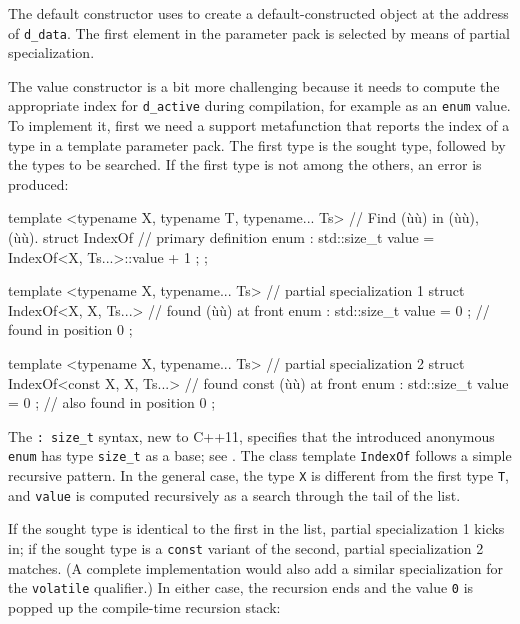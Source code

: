 \noindent The default constructor uses  to create a
default-constructed object at the address of \lstinline!d_data!. The first
element in the parameter pack is selected by means of partial
specialization.

The value constructor is a bit more challenging because it needs to
compute the appropriate index for \lstinline!d_active! during compilation,
for example as an \lstinline!enum! value. To implement it, first we need a
support metafunction that reports the index of a type in a template
parameter pack. The first type is the sought type, followed by the types
to be searched. If the first type is not among the others, an error is
produced:

\begin{emcppslisting}[emcppsbatch={e38,e39}]
template <typename X, typename T, typename... Ts>  // Find (ù{}ù) in (ù{}ù), (ù{}ù).
struct IndexOf                                     // primary definition
{
    enum : std::size_t { value = IndexOf<X, Ts...>::value + 1 };
};

template <typename X, typename... Ts>              // partial specialization 1
struct IndexOf<X, X, Ts...>                        // found (ù{}ù) at front
{
    enum : std::size_t { value = 0 };              // found in position 0
};

template <typename X, typename... Ts>              // partial specialization 2
struct IndexOf<const X, X, Ts...>                  // found const (ù{}ù) at front
{
    enum : std::size_t { value = 0 };              // also found in position 0
};
\end{emcppslisting}
    

\noindent The \lstinline!:!~\lstinline!size_t! syntax, new to C++11, specifies that the
introduced anonymous \lstinline!enum! has type \lstinline!size_t! as a base;
see . The class
template \lstinline!IndexOf! follows a simple recursive pattern. In the
general case, the type \lstinline!X! is different from the first type
\lstinline!T!, and \lstinline!value! is computed recursively as a search
through the tail of the list.

If the sought type is identical to the first in the list, partial
specialization 1 kicks in; if the sought type is a \lstinline!const!
variant of the second, partial specialization 2 matches. (A complete
implementation would also add a similar specialization for the
\lstinline!volatile! qualifier.) In either case, the recursion ends and the
value \lstinline!0! is popped up the compile-time recursion stack:

